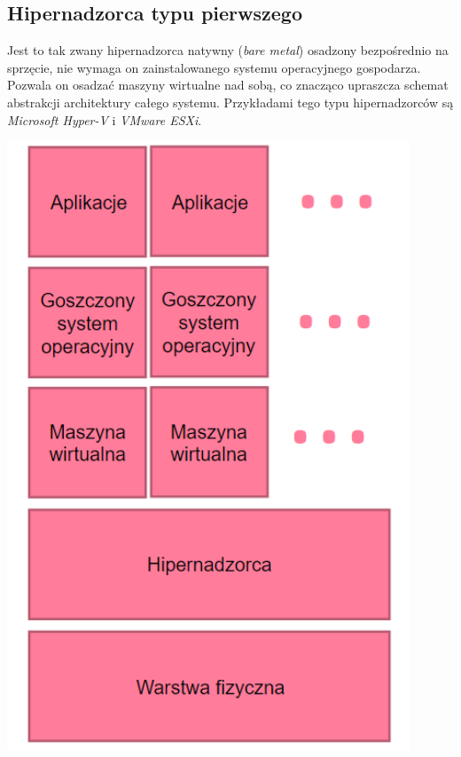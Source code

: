\documentclass[polish, a4paper, 12pt, oneside]{book}
\begin{document}
\subsection {Hipernadzorca typu pierwszego} 
Jest to tak zwany hipernadzorca natywny (\textit{bare metal}) osadzony bezpośrednio na sprzęcie, nie wymaga on zainstalowanego systemu operacyjnego gospodarza. Pozwala on osadzać maszyny wirtualne nad sobą, co znacząco upraszcza schemat abstrakcji architektury całego systemu. Przykładami tego typu hipernadzorców są \textit{Microsoft Hyper-V}\cite{hyperv} i \textit{VMware ESXi}\cite{vmwareesx}.
\begin{center}
\includegraphics[width=120mm]{schemat_hiper1.png}
\end{center}
\end{document}
